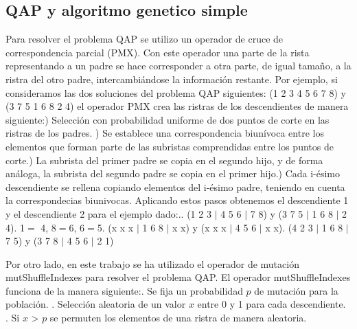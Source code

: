 \documentclass{article}
\begin{document}
 \subsection{QAP y algoritmo genetico simple}  
 Para resolver el problema QAP se utilizo un operador de cruce de correspondencia parcial (PMX). Con este operador una parte de la rista representando a un padre se hace corresponder a otra parte, de igual tamaño, a la ristra del otro padre, intercambiándose la información restante. Por ejemplo, si consideramos las dos soluciones del problema QAP siguientes: (1 2 3 4 5 6 7 8) y (3 7 5 1 6 8 2 4) el operador PMX crea las ristras de los descendientes de manera siguiente:\newline{}) Selección con probabilidad uniforme de dos puntos de corte en las ristras de los padres. ) Se establece una correspondencia biunívoca entre los elementos que forman parte de las subristas comprendidas entre los puntos de corte.) La subrista del primer padre se copia en el segundo hijo, y de forma análoga, la subrista del segundo padre se copia en el primer hijo.) Cada i-ésimo descendiente se rellena copiando elementos del i-ésimo padre, teniendo en cuenta la correspondecias biunivocas.\newline\newline
 Aplicando estos pasos obtenemos el descendiente 1 y el descendiente 2 para el ejemplo dado:.\newline{}. (1 2 3 $\mid$ 4 5 6 $\mid$ 7 8) y (3 7 5 $\mid$ 1 6 8 $\mid$ 2 4). 1$=$ 4, 8$=$6, 6$=$5. (x x x $\mid$ 1 6 8 $\mid$ x x) y (x x x $\mid$  4 5 6 $\mid$ x x). (4 2 3 $\mid$ 1 6 8 $\mid$ 7 5) y (3 7 8 $\mid$ 4 5 6 $\mid$ 2 1) \newline
 
 Por otro lado, en este trabajo se ha utilizado el operador de mutación mutShuffleIndexes para resolver el problema QAP.
 El operador mutShuffleIndexes funciona de la manera siguiente:\newline{}. Se fija un probabilidad $p$ de mutación para la población. . Selección aleatoria de un valor $x$ entre 0 y 1 para cada descendiente. . Si $x$ > $p$ se permuten los elementos de una ristra de manera aleatoria.\newline
 
\end{document}
